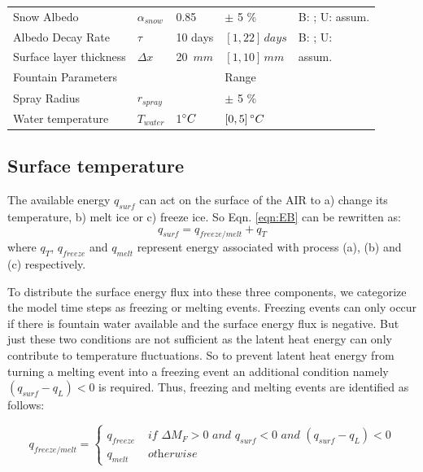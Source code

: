 \documentclass[utf8]{frontiersSCNS} %
\begin{document}
\begin{table}
\begin{tabularx}{\linewidth}{ X l X l X  }
        Snow Albedo        & $\alpha_{snow}$ & 0.85 & $\pm$ 5 \% & B: \citeauthor{CuffeyPaterson_2010}; U: assum.  \\
        Albedo Decay Rate & $\tau$ & 10 days & $[1,22]\, days$ & B: \citeauthor{Schmidt_2017}; U:
        \citeauthor{OerlemansKnap_1998}  \\ Surface layer thickness & $\Delta x$ & 20 $\,mm$ & $[1,10]\, mm$   & assum.\\
        \hline Fountain Parameters& & & Range   & \\ \hline 
        Spray Radius & $r_{spray}$ &  & $\pm$ 5 \%   & \\
        Water temperature & $T_{water}$ & 1$\degree C$ & $[0,5]\, \degree C$   & \\
        \hline \end{tabularx} \label{table:parameters} \end{table} 

\subsection{Surface temperature}
The available energy $q_{surf}$ can act on the surface of the AIR to a) change its temperature, b) melt ice or
c) freeze ice. So Eqn. \ref{eqn:EB} can be rewritten as: \begin{equation} q_{surf} = q_{freeze/melt} +
q_{T} \end{equation}
where $q_{T}$, $q_{freeze}$ and $q_{melt}$ represent energy associated with process (a), (b) and (c) respectively.

To distribute the surface energy flux into these three components, we categorize the model time steps as freezing or
melting events. Freezing events can only occur if there is fountain water available and the surface energy flux is
negative. But just these two conditions are not sufficient as the latent heat energy can only contribute to temperature
fluctuations. So to prevent latent heat energy from turning a melting event into a freezing event an additional
condition namely $(q_{surf}-q_{L}) < 0$ is required. Thus, freezing and melting events are identified as follows:

\begin{equation} 
    q_{freeze/melt} = \left\{ \begin{array}{ll}
            q_{freeze} & \textit{ if } \Delta M_{F} > 0 \textit{ and } q_{surf} < 0 \textit{ and }(q_{surf}-q_{L}) < 0 \\
            q_{melt} & \textit{ otherwise} 
    \end{array} \right. 
\end{equation} 
\end{document}
